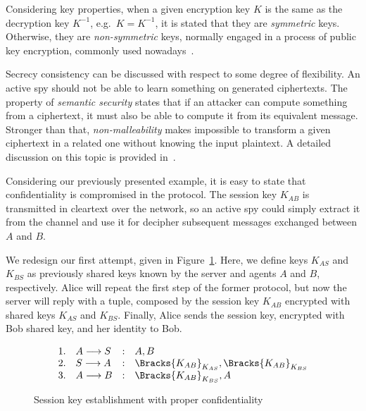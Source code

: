 Considering key properties, when a given encryption key \(K\) is the same as the decryption key \(K^{-1}\), e.g.\  \(K = K^{-1}\), it is stated that they are \emph{symmetric} keys. Otherwise, they are \emph{non-symmetric} keys, normally engaged in a process of public key encryption, commonly used nowadays~\cite{RyanSchneider2010}.

Secrecy consistency can be discussed with respect to some degree of flexibility. An active spy should not be able to learn something on generated ciphertexts. The property of \textit{semantic security} states that if an attacker can compute something from a ciphertext, it must also be able to compute it from its equivalent message. Stronger than that, \textit{non-malleability} makes impossible to transform a given ciphertext in a related one without knowing the input plaintext. A detailed discussion on this topic is provided in~\cite{Abadi99}.

Considering our previously presented example, it is easy to state that confidentiality is compromised in the protocol. The session key \(K_{AB}\) is transmitted in cleartext over the network, so an active spy could simply extract it from the channel and use it for decipher subsequent messages exchanged between \(A\) and \(B\).

We redesign our first attempt, given in Figure~\ref{prt:session-key-confidentiality}. Here, we define keys \(K_{AS}\) and \(K_{BS}\) as previously shared keys known by the server and agents \(A\) and \(B\), respectively. Alice will repeat the first step of the former protocol, but now the server will reply with a tuple, composed by the session key \(K_{AB}\) encrypted with shared keys \(K_{AS}\) and \(K_{BS}\). Finally, Alice sends the session key, encrypted with Bob shared key, and her identity to Bob.

\begin{figure}[ht]\label{prt:session-key-confidentiality}
  \centering
  \[
    \begin{array}{rlcl}
      1. & A \longrightarrow S &:& A, B \\
      2. & S \longrightarrow A &:& \Bracks{K_{AB}}_{K_{AS}}, \Bracks{K_{AB}}_{K_{BS}} \\
      3. & A \longrightarrow B &:& \Bracks{K_{AB}}_{K_{BS}},A \\
    \end{array}
  \]
  \caption{Session key establishment with proper confidentiality}
\end{figure}


